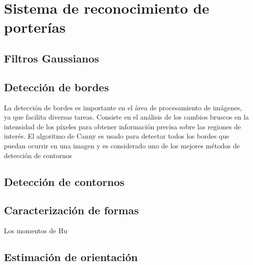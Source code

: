 \chapter{Sistema de reconocimiento de porterías}
\section{Filtros Gaussianos}

\section{Detección de bordes}
La detección de bordes es importante en el área de procesamiento de imágenes, ya que facilita diversas tareas. Consiste en el análisis de los cambios bruscos en la intensidad de los píxeles para obtener información precisa sobre las regiones de interés.\cite{rebaza2007deteccion} El algoritmo de Canny es usado para detectar todos los bordes que puedan ocurrir en una imagen y es considerado uno de los mejores métodos de detección de contornos 
\section{Detección de contornos}
\section{Caracterización de formas}
Los momentos de Hu 
\section{Estimación de orientación}